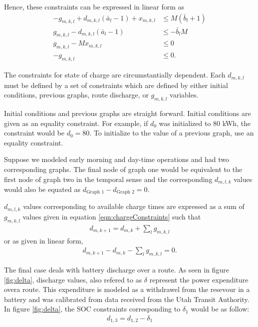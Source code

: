 Hence, these constraints can be expressed in linear form as
\begin{equation}\label{eqn:chargeConstraints}
	\begin{aligned} 
		-g_{m,k,l} + d_{m,k,l}(\bar{a}_l - 1) + x_{m,k,l} &\le M(\bar{b}_l + 1) \\
		 g_{m,k,l} - d_{m,k,l}(\bar{a}_l - 1)  &\le  - \bar{b}_lM \\
		 g_{m,k,l} - Mx_{m,k,l} &\le 0 \\
		-g_{m,k,l} &\le 0.  
	\end{aligned}
\end{equation}
\par The constraints for state of charge are circumstantially dependent. Each $d_{m,k,l}$ must be defined by a set of constraints which are defined by either initial conditions, previous graphs, route discharge, or $g_{m,k,l}$ variables.
\par Initial conditions and previous graphs are straight forward.  Initial conditions are given as an equality constraint.  For example, if $d_0$ was initialized to 80 kWh, the constraint would be $d_0 = 80$.  To initialize to the value of a previous graph, use an equality constraint.  
\par Suppose we modeled early morning and day-time operations and had two corresponding graphs. The final node of graph one would be equivalent to the first node of graph two in the temporal sense and the corresponding $d_{m,l,k}$ values would also be equated as $d_{\text{Graph 1}} - d_{\text{Graph 2}} = 0$.
\par $d_{m,l,k}$ values corresponding to available charge times are expressed as a sum of $g_{m,k,l}$ values given in equation \ref{eqn:chargeConstraints} such that
\begin{align*}
	d_{m,k + 1} = d_{m,k} + \sum_l{g_{m,k,l}}
\end{align*}
or as given in linear form,
\begin{align}
	d_{m,k+1} - d_{m,k} - \sum_l{g_{m,k,l}} = 0.
\end{align}
\par The final case deals with battery discharge over a route.  As seen in figure \ref{fig:delta}, discharge values, also refered to as $\delta$ represent the power expenditure overa route.  This expenditure is modeled as a withdrawel from the resevour in a battery and was calibrated from data received from the Utah Transit Authority.  In figure \ref{fig:delta}, the SOC constraints corresponding to $\delta_1$ would be as follow:
\begin{align*}
	d_{1,3} = d_{1,2} - \delta_1
\end{align*}
